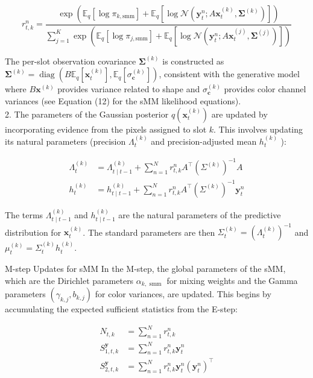 \documentclass[10pt]{article}
\begin{document}
\begin{equation*}
r_{t, k}^{n}=\frac{\exp \left(\mathbb{E}_{q}\left[\log \pi_{k, \mathrm{smm}}\right]+\mathbb{E}_{q}\left[\log \mathcal{N}\left(\mathbf{y}_{t}^{n} ; A \mathbf{x}_{t}^{(k)}, \boldsymbol{\Sigma}^{(k)}\right)\right]\right)}{\sum_{j=1}^{K} \exp \left(\mathbb{E}_{q}\left[\log \pi_{j, \mathrm{smm}}\right]+\mathbb{E}_{q}\left[\log \mathcal{N}\left(\mathbf{y}_{t}^{n} ; A \mathbf{x}_{t}^{(j)}, \boldsymbol{\Sigma}^{(j)}\right)\right]\right)} \tag{40}
\end{equation*}


The per-slot observation covariance $\boldsymbol{\Sigma}^{(k)}$ is constructed as $\boldsymbol{\Sigma}^{(k)}= \operatorname{diag}\left(B \mathbb{E}_{q}\left[\mathbf{x}_{t}^{(k)}\right], \mathbb{E}_{q}\left[\sigma_{\mathbf{c}}^{(k)}\right]\right)$, consistent with the generative model where $B \mathbf{x}^{(k)}$ provides variance related to shape and $\sigma_{\mathbf{c}}^{(k)}$ provides color channel variances (see Equation (12) for the sMM likelihood equations).\\
2. The parameters of the Gaussian posterior $q\left(\mathbf{x}_{t}^{(k)}\right)$ are updated by incorporating evidence from the pixels assigned to slot $k$. This involves updating its natural parameters (precision $\Lambda_{t}^{(k)}$ and precision-adjusted mean $h_{t}^{(k)}$ ):


\begin{align*}
\Lambda_{t}^{(k)} & =\Lambda_{t \mid t-1}^{(k)}+\sum_{n=1}^{N} r_{t, k}^{n} A^{\top}\left(\Sigma^{(k)}\right)^{-1} A  \tag{41}\\
h_{t}^{(k)} & =h_{t \mid t-1}^{(k)}+\sum_{n=1}^{N} r_{t, k}^{n} A^{\top}\left(\Sigma^{(k)}\right)^{-1} \mathbf{y}_{t}^{n}
\end{align*}


The terms $\Lambda_{t \mid t-1}^{(k)}$ and $h_{t \mid t-1}^{(k)}$ are the natural parameters of the predictive distribution for $\mathbf{x}_{t}^{(k)}$. The standard parameters are then $\Sigma_{t}^{(k)}=\left(\Lambda_{t}^{(k)}\right)^{-1}$ and $\mu_{t}^{(k)}=\Sigma_{t}^{(k)} h_{t}^{(k)}$.

M-step Updates for sMM In the M-step, the global parameters of the sMM, which are the Dirichlet parameters $\alpha_{k, \text { smm }}$ for mixing weights and the Gamma parameters $\left(\gamma_{k, j}, b_{k, j}\right)$ for color variances, are updated. This begins by accumulating the expected sufficient statistics from the E-step:


\begin{align*}
N_{t, k} & =\sum_{n=1}^{N} r_{t, k}^{n} \\
S_{1, t, k}^{\mathbf{y}} & =\sum_{n=1}^{N} r_{t, k}^{n} \mathbf{y}_{t}^{n}  \tag{42}\\
S_{2, t, k}^{\mathbf{y}} & =\sum_{n=1}^{N} r_{t, k}^{n} \mathbf{y}_{t}^{n}\left(\mathbf{y}_{t}^{n}\right)^{\top}
\end{align*}
\end{document}
